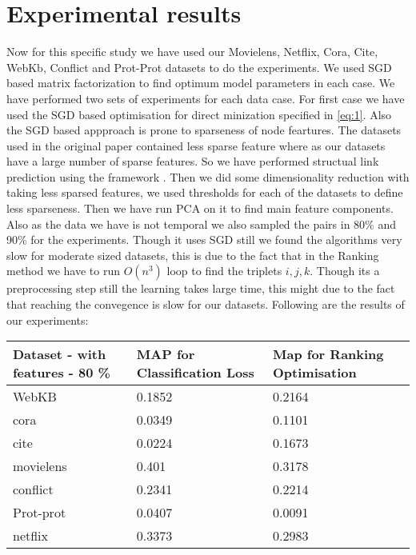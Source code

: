 \section*{Experimental results}
Now for this specific study we have used our Movielens, Netflix, Cora, Cite, WebKb, Conflict and Prot-Prot datasets to do the experiments. We used SGD based matrix factorization to find optimum model parameters in each case.  We have performed two sets of experiments for each data case. For first case we have used the SGD based optimisation for direct minization specified in  \ref{eq:1}. Also the SGD based appproach is prone to sparseness of node feartures. The datasets used in the original paper contained less sparse feature where as our datasets have a large number of sparse features. So we have performed structual link prediction using the framework . Then we did some dimensionality reduction with taking less sparsed features, we used thresholds for each of the datasets to define less sparseness. Then we have run PCA on it to find main feature components. Also as the data we have is not temporal we also sampled the pairs in 80\% and 90\% for the experiments. Though it uses SGD still we found the algorithms very slow for moderate sized datasets, this is due to the fact that in the Ranking method we have to run $O(n^3)$ loop to find the triplets $i,j,k$. Though its a preprocessing step still the learning takes large time, this might due to the fact that reaching the convegence is slow for our datasets. Following are the results of our experiments:


\begin{center}
\begin{table}
    \begin{tabular}{|l|l|l|}
    \hline
    Dataset - with features - 80 \% & MAP for Classification Loss & Map for Ranking Optimisation \\ \hline
    WebKB                           & 0.1852                      & 0.2164                       \\ \hline
    cora                            & 0.0349                      & 0.1101                       \\ \hline
    cite                            & 0.0224                      & 0.1673                       \\ \hline
    movielens                       & 0.401                       & 0.3178                       \\ \hline
    conflict                        & 0.2341                      & 0.2214                       \\ \hline
    Prot-prot                       & 0.0407                      & 0.0091                       \\ \hline
    netflix                         & 0.3373                      & 0.2983                       \\ \hline
    \end{tabular}
\end{table}
\end{center}


